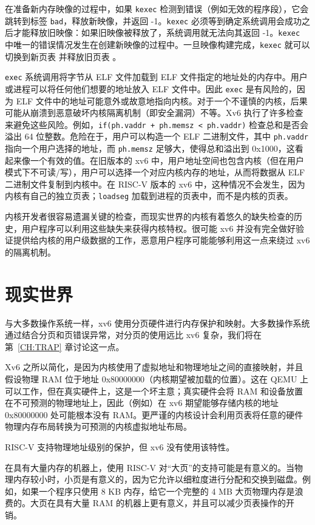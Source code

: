 在准备新内存映像的过程中，如果 \lstinline{kexec} 检测到错误（例如无效的程序段），它会跳转到标签 \lstinline{bad}，释放新映像，并返回 -1。\lstinline{kexec} 必须等到确定系统调用会成功之后才能释放旧映像：如果旧映像被释放了，系统调用就无法向其返回 -1。\lstinline{kexec} 中唯一的错误情况发生在创建新映像的过程中。一旦映像构建完成，\lstinline{kexec} 就可以切换到新页表  并释放旧页表 。

\lstinline{exec} 系统调用将字节从 ELF 文件加载到 ELF 文件指定的地址处的内存中。用户或进程可以将任何他们想要的地址放入 ELF 文件中。因此 \lstinline{exec} 是有风险的，因为 ELF 文件中的地址可能意外或故意地指向内核。对于一个不谨慎的内核，后果可能从崩溃到恶意破坏内核隔离机制（即安全漏洞）不等。Xv6 执行了许多检查来避免这些风险。例如，\lstinline{if(ph.vaddr + ph.memsz < ph.vaddr)} 检查总和是否会溢出 64 位整数。危险在于，用户可以构造一个 ELF 二进制文件，其中 \lstinline{ph.vaddr} 指向一个用户选择的地址，而 \lstinline{ph.memsz} 足够大，使得总和溢出到 0x1000，这看起来像一个有效的值。在旧版本的 xv6 中，用户地址空间也包含内核（但在用户模式下不可读/写），用户可以选择一个对应内核内存的地址，从而将数据从 ELF 二进制文件复制到内核中。在 RISC-V 版本的 xv6 中，这种情况不会发生，因为内核有自己的独立页表；\lstinline{loadseg} 加载到进程的页表中，而不是内核的页表。

内核开发者很容易遗漏关键的检查，而现实世界的内核有着悠久的缺失检查的历史，用户程序可以利用这些缺失来获得内核特权。很可能 xv6 并没有完全做好验证提供给内核的用户级数据的工作，恶意用户程序可能能够利用这一点来绕过 xv6 的隔离机制。

\section{现实世界}
与大多数操作系统一样，xv6 使用分页硬件进行内存保护和映射。大多数操作系统通过结合分页和页错误异常，对分页的使用远比 xv6 复杂，我们将在第~\ref{CH:TRAP} 章讨论这一点。

Xv6 之所以简化，是因为内核使用了虚拟地址和物理地址之间的直接映射，并且假设物理 RAM 位于地址 0x80000000（内核期望被加载的位置）。这在 QEMU 上可以工作，但在真实硬件上，这是一个坏主意；真实硬件会将 RAM 和设备放置在不可预测的物理地址上，因此（例如）在 xv6 期望能够存储内核的地址 0x80000000 处可能根本没有 RAM。更严谨的内核设计会利用页表将任意的硬件物理内存布局转换为可预测的内核虚拟地址布局。

RISC-V 支持物理地址级别的保护，但 xv6 没有使用该特性。

在具有大量内存的机器上，使用 RISC-V 对“大页”的支持可能是有意义的。当物理内存较小时，小页是有意义的，因为它允许以细粒度进行分配和交换到磁盘。例如，如果一个程序只使用 8 KB 内存，给它一个完整的 4 MB 大页物理内存是浪费的。大页在具有大量 RAM 的机器上更有意义，并且可以减少页表操作的开销。

